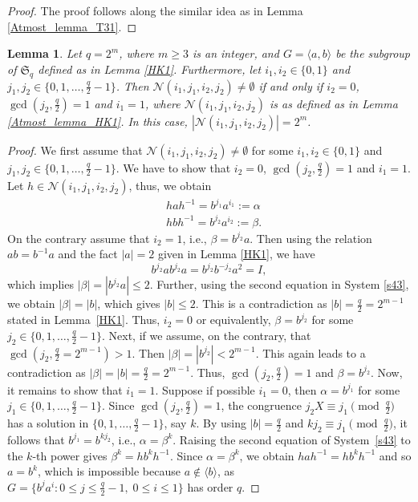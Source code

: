 \documentclass[11pt]{amsart}
\theoremstyle{plain}
\newtheorem{lem}[thm]{Lemma}
\numberwithin{equation}{section}
\begin{document}
\begin{proof}
The proof follows along the similar idea as in Lemma \ref{Atmost_lemma_T31}.
\end{proof}
\begin{lem}\label{Atleast_lemma_HK1}
Let $q=2^m$, where $m \geq 3$ is an integer, and $G=\langle a,b \rangle$ be the subgroup of $\mathfrak{S}_q$ defined as in Lemma \ref{HK1}. Furthermore,  let $i_1,i_2 \in \{0,1\}$ and $j_1,j_2 \in \{0,1,\ldots,\frac{q}{2}-1\}$. Then $\mathcal{N}(i_1,j_1,i_2,j_2) \neq \emptyset$ if and only if $i_2=0$, $\gcd(j_2,\frac{q}{2})=1$ and $i_1=1$, where $\mathcal{N}(i_1,j_1,i_2,j_2)$ is as defined as in Lemma \ref{Atmost_lemma_HK1}. In this case, $|\mathcal{N}(i_1,j_1,i_2,j_2)|=2^m$.
\end{lem}
\begin{proof} We first assume that $\mathcal{N}(i_1,j_1,i_2,j_2) \neq \emptyset$ for some $i_1,i_2 \in \{0,1\}$ and $j_1,j_2 \in \{0,1,\ldots,\frac{q}{2}-1\}$. We have to show that $i_2=0$, $\gcd(j_2,\frac{q}{2})=1$ and $i_1=1$.  Let $h \in \mathcal{N}(i_1,j_1,i_2,j_2)$, thus,  we obtain 
\begin{equation}\label{s43}
\begin{split}
&hah^{-1}=b^{j_1}a^{i_1}:=\alpha\\
&hbh^{-1}=b^{j_2}a^{i_2}:=\beta.
\end{split}
\end{equation}
On the contrary assume that $i_2=1$, i.e., $\beta=b^{j_2}a$. Then using the relation $ab=b^{-1}a$ and the fact $|a|=2$ given in Lemma \ref{HK1}, we have $$b^{j_2}ab^{j_2}a=b^{j_2}b^{-j_2}a^2=I,$$ which implies $|\beta|=|b^{j_2}a| \leq 2$. Further, using the second equation in System \eqref{s43}, we obtain $|\beta|=|b|$, which gives $|b|\leq 2$. This is a contradiction as $|b| = \frac{q}{2} = 2^{m-1}$ stated in Lemma~\ref{HK1}. Thus, $i_2=0$ or equivalently, $\beta=b^{j_2}$ for some $j_2 \in \{0,1,\ldots,\frac{q}{2}-1\}$.  Next, if we assume, on the contrary, that $\gcd(j_2,\frac{q}{2}=2^{m-1})>1$. Then $|\beta|=|b^{j_2}|< 2^{m-1}.$ This again leads to a contradiction as $|\beta|=|b| = \frac{q}{2} = 2^{m-1}$.  Thus, $\gcd(j_2,\frac{q}{2})=1$ and $\beta=b^{j_2}$. Now, it remains to show that $i_1=1$. Suppose if possible $i_1=0$, then $\alpha=b^{j_1}$ for some $j_1 \in \{0,1,\ldots,\frac{q}{2}-1\}$. Since $\gcd(j_2,\frac{q}{2})=1$, the congruence $j_2X \equiv j_1 \pmod {\frac{q}{2}}$ has a solution in $\{0,1, \ldots, \frac{q}{2}-1\}$, say $k$. By using $|b| = \frac{q}{2}$ and $k j_2 \equiv j_1 \pmod {\frac{q}{2}}$, it follows that $b^{j_1} = b^{k j_2}$, i.e., $\alpha=\beta^{k}$. Raising the second equation of System~\ref{s43} to the $k$-th power gives 
$\beta^{k} = h b^{k} h^{-1}$. 
Since $\alpha = \beta^{k}$, we obtain $h a h^{-1} = h b^{k} h^{-1}$  and so
$a = b^{k}$, which is impossible because $a \notin \langle b \rangle$, as $G = \{ b^{j} a^{i} : 0 \le j \le \frac{q}{2}-1,\; 0 \le i \le 1 \}$ has order $q$.



\end{proof}
\end{document}
